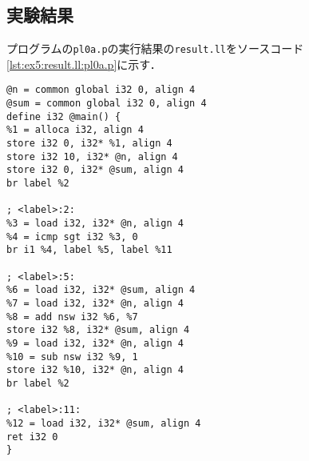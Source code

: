 \documentclass[uplatex]{jsarticle}
\begin{document}
\subsection{実験結果}
プログラムの\verb#pl0a.p#の実行結果の\verb#result.ll#をソースコード\ref{lst:ex5:result.ll:pl0a.p}に示す．
\begin{lstlisting}[caption=condition句の処理,label=lst:ex5:result.ll:pl0a.p]
@n = common global i32 0, align 4
@sum = common global i32 0, align 4
define i32 @main() {
%1 = alloca i32, align 4
store i32 0, i32* %1, align 4
store i32 10, i32* @n, align 4
store i32 0, i32* @sum, align 4
br label %2

; <label>:2:
%3 = load i32, i32* @n, align 4
%4 = icmp sgt i32 %3, 0
br i1 %4, label %5, label %11

; <label>:5:
%6 = load i32, i32* @sum, align 4
%7 = load i32, i32* @n, align 4
%8 = add nsw i32 %6, %7
store i32 %8, i32* @sum, align 4
%9 = load i32, i32* @n, align 4
%10 = sub nsw i32 %9, 1
store i32 %10, i32* @n, align 4
br label %2

; <label>:11:
%12 = load i32, i32* @sum, align 4
ret i32 0
}
\end{lstlisting}
\end{document}
